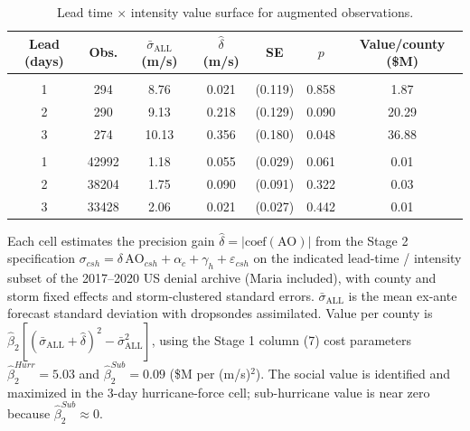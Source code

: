 \begin{table}

\caption{Lead time $\times$ intensity value surface for augmented observations. \label{tab:value-surface}}
\centering
\begin{adjustbox}{max width = \textwidth}
\begin{threeparttable}
\begin{tabular}[t]{ccccccc}
\toprule
Lead (days) & Obs. & $\bar{\sigma}_{\text{ALL}}$ (m/s) & $\hat{\delta}$ (m/s) & SE & $p$ & Value/county (\$M)\\
\midrule
\addlinespace[0.3em]
\multicolumn{7}{l}{\textbf{Hurricane-force ($\geq$ 33 m/s)}}\\
\hspace{1em}1 & 294 & 8.76 & 0.021 & (0.119) & 0.858 & 1.87\\
\hspace{1em}2 & 290 & 9.13 & 0.218 & (0.129) & 0.090 & 20.29\\
\hspace{1em}3 & 274 & 10.13 & 0.356 & (0.180) & 0.048 & 36.88\\
\addlinespace[0.3em]
\multicolumn{7}{l}{\textbf{Sub-hurricane ($<$ 33 m/s)}}\\
\hspace{1em}1 & 42992 & 1.18 & 0.055 & (0.029) & 0.061 & 0.01\\
\hspace{1em}2 & 38204 & 1.75 & 0.090 & (0.091) & 0.322 & 0.03\\
\hspace{1em}3 & 33428 & 2.06 & 0.021 & (0.027) & 0.442 & 0.01\\
\bottomrule
\end{tabular}
\begin{tablenotes}
\item Each cell estimates the precision gain $\hat{\delta}=|\text{coef}(\text{AO})|$ from the Stage 2 specification $\sigma_{csh}=\delta\,\text{AO}_{csh}+\alpha_c+\gamma_h+\varepsilon_{csh}$ on the indicated lead-time / intensity subset of the 2017--2020 US denial archive (Maria included), with county and storm fixed effects and storm-clustered standard errors. $\bar{\sigma}_{\text{ALL}}$ is the mean ex-ante forecast standard deviation with dropsondes assimilated. Value per county is $\hat{\beta}_2[(\bar{\sigma}_{\text{ALL}}+\hat{\delta})^2-\bar{\sigma}_{\text{ALL}}^2]$, using the Stage 1 column (7) cost parameters $\hat{\beta}_2^{Hurr}=5.03$ and $\hat{\beta}_2^{Sub}=0.09$ (\$M per (m/s)$^2$). The social value is identified and maximized in the 3-day hurricane-force cell; sub-hurricane value is near zero because $\hat{\beta}_2^{Sub}\approx0$.
\end{tablenotes}
\end{threeparttable}
\end{adjustbox}
\end{table}
